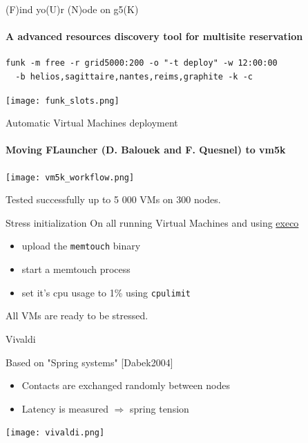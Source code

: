 \documentclass{beamer}
\begin{document}
\begin{frame}[fragile]{(F)ind yo(U)r (N)ode on g5(K)}
\framesubtitle{A advanced resources discovery tool for multisite reservation}
\small
\begin{verbatim}
funk -m free -r grid5000:200 -o "-t deploy" -w 12:00:00 
  -b helios,sagittaire,nantes,reims,graphite -k -c
\end{verbatim}
\begin{center}
\texttt{[image: funk\_slots.png]}
\end{center}
\end{frame}

 
\begin{frame}{Automatic Virtual Machines deployment}
\framesubtitle{Moving FLauncher (D. Balouek and F. Quesnel) to vm5k}
\begin{center}
\texttt{[image: vm5k\_workflow.png]}
\end{center}
\begin{alertblock}{}
Tested successfully up to 5 000 VMs on 300 nodes.
\end{alertblock}
\end{frame}

\begin{frame}[fragile]{Stress initialization}
On all running Virtual Machines and using \href{http://execo.gforge.inria.fr/doc/latest-stable/userguide.html}{execo}
\begin{itemize}
    \item upload the \verb=memtouch= binary
    \item start a memtouch process
    \item set it's cpu usage to 1\% using \verb=cpulimit=
\end{itemize}
\begin{alertblock}{}
All VMs are ready to be stressed.
\end{alertblock}

\end{frame}

\begin{frame}{Vivaldi}
\begin{minipage}{0.40\linewidth}
Based on "Spring systems" [Dabek2004]
\begin{itemize}
    \item Contacts are exchanged randomly between nodes
    \item Latency is measured $\Rightarrow$ spring tension
\end{itemize}
\end{minipage}
\hfill
\begin{minipage}{0.55\linewidth}
\texttt{[image: vivaldi.png]}
\end{minipage}
\end{frame}
\end{document}
